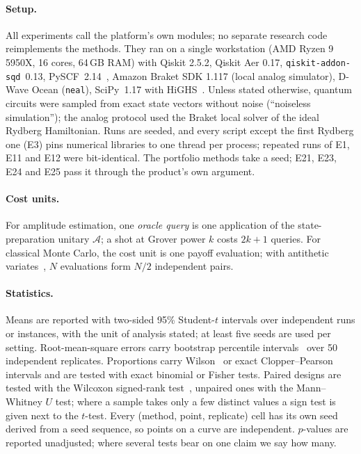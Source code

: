 \documentclass[11pt,a4paper]{article}
\begin{document}
\paragraph{Setup.} All experiments call the platform's own modules; no
separate research code reimplements the methods. They ran on a single
workstation (AMD Ryzen 9 5950X, 16 cores, 64\,GB RAM) with Qiskit 2.5.2,
Qiskit Aer 0.17, \texttt{qiskit-addon-sqd}~0.13, PySCF~2.14~\cite{pyscf2020},
Amazon Braket SDK 1.117 (local analog simulator), D-Wave Ocean
(\texttt{neal}), SciPy~1.17 with HiGHS~\cite{virtanen2020,huangfu2018}. Unless
stated otherwise, quantum circuits were sampled from exact state vectors
without noise (``noiseless simulation''); the analog protocol used the Braket
local solver of the ideal Rydberg Hamiltonian. Runs are seeded, and every
script except the first Rydberg one (E3) pins numerical libraries to one
thread per process; repeated runs of E1, E11 and E12 were bit-identical. The
portfolio methods take a seed; E21, E23, E24
and E25 pass it through the product's own argument.

\paragraph{Cost units.} For amplitude estimation, one \emph{oracle query} is one
application of the state-preparation unitary $\mathcal A$; a shot at Grover
power $k$ costs $2k+1$ queries. For classical Monte Carlo, the cost unit is one
payoff evaluation; with antithetic variates~\cite{glasserman2003}, $N$
evaluations form $N/2$ independent pairs.

\paragraph{Statistics.} Means are reported with two-sided 95\% Student-$t$
intervals over independent runs or instances, with the unit of analysis
stated; at least five seeds are used per setting. Root-mean-square errors
carry bootstrap percentile intervals~\cite{efron1979} over 50 independent
replicates. Proportions carry Wilson~\cite{wilson1927} or exact
Clopper--Pearson~\cite{clopper1934} intervals and are tested with exact
binomial or Fisher tests. Paired designs are tested with the Wilcoxon
signed-rank test~\cite{wilcoxon1945}, unpaired ones with the Mann--Whitney
$U$ test; where a sample takes only a few distinct values a sign test is
given next to the $t$-test. Every (method, point, replicate) cell has its own seed derived from
a seed sequence, so points on a curve are independent. $p$-values are
reported unadjusted; where several tests bear on one claim we say how many.
\end{document}
